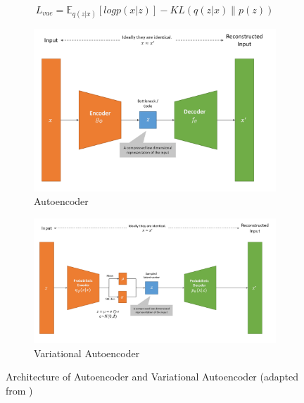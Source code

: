 \begin{equation}
    \label{eqn:vae_loss}
    L_{vae} =\mathbb{E}_{q(z|x)}[logp(x|z)]-KL(q(z|x) \parallel p(z))
\end{equation}


\begin{figure}[H]
  \centering
  \begin{subfigure}{0.8\textwidth}
    \includegraphics[width=\linewidth]{images/ae.png}
    \caption{Autoencoder} \label{fig:ae}
  \end{subfigure}
  \vspace{\baselineskip}   %
  \begin{subfigure}{0.8\textwidth}
    \includegraphics[width=\linewidth]{images/vae.png}
    \caption{Variational Autoencoder} \label{fig:vae}
  \end{subfigure}
\captionsetup{justification=centering}
\caption[Autoencoders]{Architecture of Autoencoder and Variational Autoencoder (adapted from \cite{weng2018AutoencoderBetaVAE})} \label{fig:vae_overview}
\end{figure}



